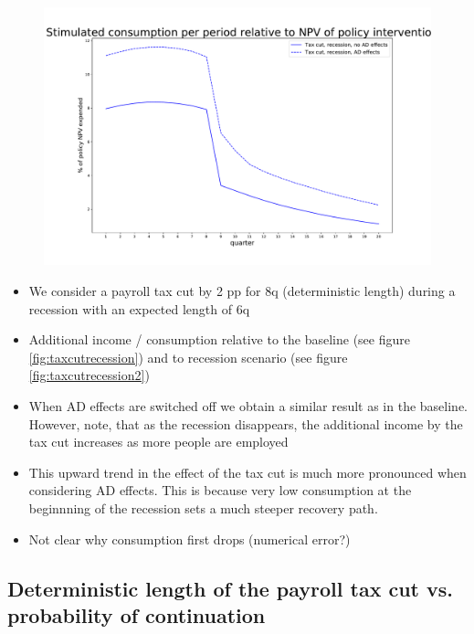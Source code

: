 \documentclass[]{article}
\begin{document}
\begin{figure}
	\centering
	\includegraphics[width=\linewidth]{../full_run/stimulated-consumption_RecTaxCut}
	\caption{}
	\label{fig:stimulated-consumptionrectaxcut}
\end{figure}



\begin{itemize}
	\item We consider a payroll tax cut by 2 pp for 8q (deterministic length) during a recession with an expected length of 6q 
	\item Additional income / consumption relative to the baseline (see figure \ref{fig:taxcutrecession}) and to recession scenario (see figure \ref{fig:taxcutrecession2})
	\item When AD effects are switched off we obtain a similar result as in the baseline. However, note, that as the recession disappears, the additional income by the tax cut increases as more people are employed
	\item This upward trend in the effect of the tax cut is much more pronounced when considering AD effects. This is because very low consumption at the beginnning of the recession sets a much steeper recovery path.
	\item Not clear why consumption first drops (numerical error?)
\end{itemize}


	
\FloatBarrier	
\subsection{Deterministic length of the payroll tax cut vs. probability of continuation}
\end{document}
